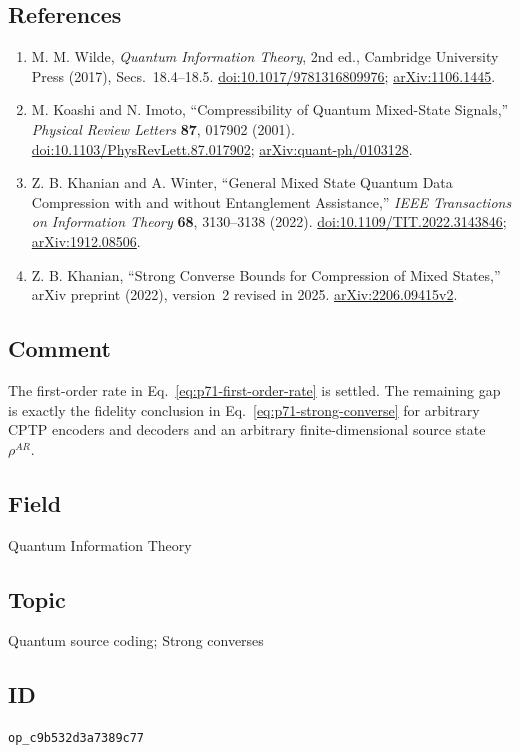 \subsection*{References}

\begin{enumerate}[label={},leftmargin=4.8em,labelsep=0.5em]
  \footnotesize
  \item[\textup{[Wil17]}]\label{ref:p71-wilde}
  M. M. Wilde, \emph{Quantum Information Theory}, 2nd ed., Cambridge
  University Press (2017), Secs.~18.4--18.5.
  \href{https://doi.org/10.1017/9781316809976}{doi:10.1017/9781316809976};
  \href{https://arxiv.org/abs/1106.1445}{arXiv:1106.1445}.

  \item[\textup{[KI01]}]\label{ref:p71-koashi-imoto}
  M. Koashi and N. Imoto, ``Compressibility of Quantum Mixed-State Signals,''
  \emph{Physical Review Letters} \textbf{87}, 017902 (2001).
  \href{https://doi.org/10.1103/PhysRevLett.87.017902}{doi:10.1103/PhysRevLett.87.017902};
  \href{https://arxiv.org/abs/quant-ph/0103128}{arXiv:quant-ph/0103128}.

  \item[\textup{[KW22]}]\label{ref:p71-khanian-winter}
  Z. B. Khanian and A. Winter,
  ``General Mixed State Quantum Data Compression with and without
  Entanglement Assistance,'' \emph{IEEE Transactions on Information Theory}
  \textbf{68}, 3130--3138 (2022).
  \href{https://doi.org/10.1109/TIT.2022.3143846}{doi:10.1109/TIT.2022.3143846};
  \href{https://arxiv.org/abs/1912.08506}{arXiv:1912.08506}.

  \item[\textup{[Kha25]}]\label{ref:p71-khanian-strong}
  Z. B. Khanian, ``Strong Converse Bounds for Compression of Mixed States,''
  arXiv preprint (2022), version~2 revised in 2025.
  \href{https://arxiv.org/abs/2206.09415v2}{arXiv:2206.09415v2}.
\end{enumerate}

\subsection*{Comment}

The first-order rate in Eq.~\eqref{eq:p71-first-order-rate} is settled.  The
remaining gap is exactly the fidelity conclusion in
Eq.~\eqref{eq:p71-strong-converse} for arbitrary CPTP encoders and decoders
and an arbitrary finite-dimensional source state $\rho^{AR}$.

\subsection*{Field}

Quantum Information Theory

\subsection*{Topic}

Quantum source coding; Strong converses

\subsection*{ID}

\texttt{op\_c9b532d3a7389c77}
